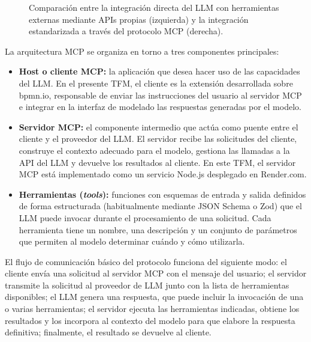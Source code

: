 \begin{figure}[ht]
{%
}
\shorthandon{<>}
\caption{Comparación entre la integración directa del LLM con herramientas externas mediante APIs propias (izquierda) y la integración estandarizada a través del protocolo MCP (derecha).}
\label{fig:mcpComparacion}
\end{figure}

La arquitectura MCP se organiza en torno a tres componentes principales:

\begin{itemize}
    \item[$\bullet$] \textbf{Host o cliente MCP:} la aplicación que desea hacer uso de las capacidades del LLM. En el presente TFM, el cliente es la extensión desarrollada sobre bpmn.io, responsable de enviar las instrucciones del usuario al servidor MCP e integrar en la interfaz de modelado las respuestas generadas por el modelo.

    \item[$\bullet$] \textbf{Servidor MCP:} el componente intermedio que actúa como puente entre el cliente y el proveedor del LLM. El servidor recibe las solicitudes del cliente, construye el contexto adecuado para el modelo, gestiona las llamadas a la API del LLM y devuelve los resultados al cliente. En este TFM, el servidor MCP está implementado como un servicio Node.js desplegado en Render.com.

    \item[$\bullet$] \textbf{Herramientas (\textit{tools}):} funciones con esquemas de entrada y salida definidos de forma estructurada (habitualmente mediante JSON Schema o Zod) que el LLM puede invocar durante el procesamiento de una solicitud. Cada herramienta tiene un nombre, una descripción y un conjunto de parámetros que permiten al modelo determinar cuándo y cómo utilizarla.
\end{itemize}

El flujo de comunicación básico del protocolo funciona del siguiente modo: el cliente envía una solicitud al servidor MCP con el mensaje del usuario; el servidor transmite la solicitud al proveedor de LLM junto con la lista de herramientas disponibles; el LLM genera una respuesta, que puede incluir la invocación de una o varias herramientas; el servidor ejecuta las herramientas indicadas, obtiene los resultados y los incorpora al contexto del modelo para que elabore la respuesta definitiva; finalmente, el resultado se devuelve al cliente.

